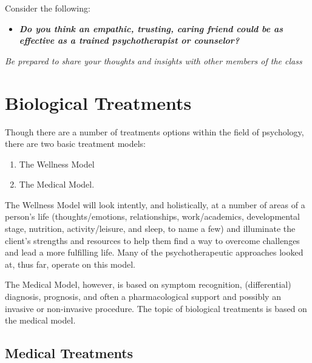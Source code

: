 \documentclass[
]{book}
\providecommand{\tightlist}{%
  \setlength{\itemsep}{0pt}\setlength{\parskip}{0pt}}
\begin{document}
\begin{reflect}
Consider the following:

\begin{itemize}
\tightlist
\item
  \textbf{\emph{Do you think an empathic, trusting, caring friend could be as effective as a trained psychotherapist or counselor?}}
\end{itemize}

\emph{Be prepared to share your thoughts and insights with other members of the class}
\end{reflect}

\hypertarget{biological-treatments}{%
\section{Biological Treatments}\label{biological-treatments}}

Though there are a number of treatments options within the field of psychology, there are two basic treatment models:

\begin{enumerate}
\def\labelenumi{\arabic{enumi}.}
\tightlist
\item
  The Wellness Model\\
\item
  The Medical Model.
\end{enumerate}

The Wellness Model will look intently, and holistically, at a number of areas of a person's life (thoughts/emotions, relationships, work/academics, developmental stage, nutrition, activity/leisure, and sleep, to name a few) and illuminate the client's strengths and resources to help them find a way to overcome challenges and lead a more fulfilling life. Many of the psychotherapeutic approaches looked at, thus far, operate on this model.

The Medical Model, however, is based on symptom recognition, (differential) diagnosis, prognosis, and often a pharmacological support and possibly an invasive or non-invasive procedure. The topic of biological treatments is based on the medical model.

\hypertarget{medical-treatments}{%
\subsection*{Medical Treatments}\label{medical-treatments}}
\end{document}
